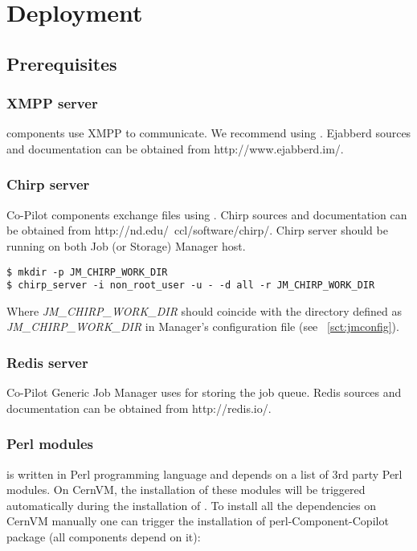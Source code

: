 \chapter{Deployment}
\section{Prerequisites}
\subsection{XMPP server}
\copilot components use XMPP to communicate. We recommend using  \cite{ejabberd}. Ejabberd sources and documentation can be obtained from
http://www.ejabberd.im/.

\subsection{Chirp server}
Co-Pilot components exchange files using \cite{chirp}. Chirp sources and documentation can be obtained from http://nd.edu/~ccl/software/chirp/. Chirp server should be running on both Job (or Storage) Manager host.

\lstset{caption=Starting Chirp server}
\begin{lstlisting}
$ mkdir -p JM_CHIRP_WORK_DIR
$ chirp_server -i non_root_user -u - -d all -r JM_CHIRP_WORK_DIR
\end{lstlisting}

Where \emph{JM\_CHIRP\_WORK\_DIR} should coincide with the directory defined as \emph{JM\_CHIRP\_WORK\_DIR} in Manager's configuration file (see ~\ref{sct:jmconfig}).

\subsection{Redis server}
Co-Pilot Generic Job Manager uses \cite{redis} for storing the job queue. Redis sources and documentation can be obtained from http://redis.io/.

\subsection{Perl modules}
\copilot is written in Perl programming language and depends on a list of 3rd party Perl modules. On CernVM, the installation of these modules will be triggered automatically during the installation of \copilot. To install all the dependencies on CernVM manually one can trigger the installation of perl-Component-Copilot package (all \copilot components depend on it):

